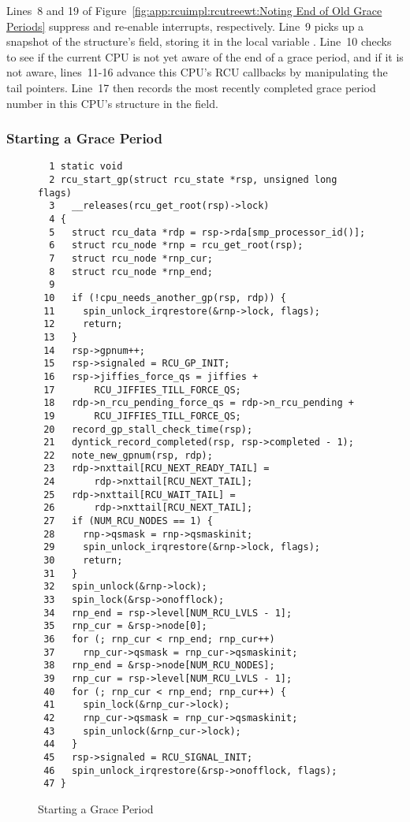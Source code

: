 Lines~8 and 19 of
Figure~\ref{fig:app:rcuimpl:rcutreewt:Noting End of Old Grace Periods}
suppress and re-enable interrupts, respectively.
Line~9 picks up a snapshot of the  structure's
 field, storing it in the local variable
.
Line~10 checks to see if the current CPU is not yet aware of the
end of a grace period, and if it is not aware,
lines~11-16 advance this CPU's RCU callbacks by manipulating the
tail pointers.
Line~17 then records the most recently completed grace period number
in this CPU's  structure in the 
field.

\subsubsection{Starting a Grace Period}
\label{app:rcuimpl:rcutreewt:Starting a Grace Period}

\begin{figure}[tbp]
{ \scriptsize
\begin{verbatim}
  1 static void
  2 rcu_start_gp(struct rcu_state *rsp, unsigned long flags)
  3   __releases(rcu_get_root(rsp)->lock)
  4 {
  5   struct rcu_data *rdp = rsp->rda[smp_processor_id()];
  6   struct rcu_node *rnp = rcu_get_root(rsp);
  7   struct rcu_node *rnp_cur;
  8   struct rcu_node *rnp_end;
  9
 10   if (!cpu_needs_another_gp(rsp, rdp)) {
 11     spin_unlock_irqrestore(&rnp->lock, flags);
 12     return;
 13   }
 14   rsp->gpnum++;
 15   rsp->signaled = RCU_GP_INIT;
 16   rsp->jiffies_force_qs = jiffies +
 17       RCU_JIFFIES_TILL_FORCE_QS;
 18   rdp->n_rcu_pending_force_qs = rdp->n_rcu_pending +
 19       RCU_JIFFIES_TILL_FORCE_QS;
 20   record_gp_stall_check_time(rsp);
 21   dyntick_record_completed(rsp, rsp->completed - 1);
 22   note_new_gpnum(rsp, rdp);
 23   rdp->nxttail[RCU_NEXT_READY_TAIL] =
 24       rdp->nxttail[RCU_NEXT_TAIL];
 25   rdp->nxttail[RCU_WAIT_TAIL] =
 26       rdp->nxttail[RCU_NEXT_TAIL];
 27   if (NUM_RCU_NODES == 1) {
 28     rnp->qsmask = rnp->qsmaskinit;
 29     spin_unlock_irqrestore(&rnp->lock, flags);
 30     return;
 31   }
 32   spin_unlock(&rnp->lock);
 33   spin_lock(&rsp->onofflock);
 34   rnp_end = rsp->level[NUM_RCU_LVLS - 1];
 35   rnp_cur = &rsp->node[0];
 36   for (; rnp_cur < rnp_end; rnp_cur++)
 37     rnp_cur->qsmask = rnp_cur->qsmaskinit;
 38   rnp_end = &rsp->node[NUM_RCU_NODES];
 39   rnp_cur = rsp->level[NUM_RCU_LVLS - 1];
 40   for (; rnp_cur < rnp_end; rnp_cur++) {
 41     spin_lock(&rnp_cur->lock);
 42     rnp_cur->qsmask = rnp_cur->qsmaskinit;
 43     spin_unlock(&rnp_cur->lock);
 44   }
 45   rsp->signaled = RCU_SIGNAL_INIT;
 46   spin_unlock_irqrestore(&rsp->onofflock, flags);
 47 }
\end{verbatim}
}
\caption{Starting a Grace Period}
\label{fig:app:rcuimpl:rcutreewt:Starting a Grace Period}
\end{figure}


